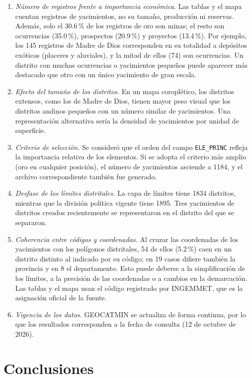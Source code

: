 \documentclass[man,12pt,a4paper,floatsintext,donotrepeattitle]{apa7}
\begin{document}
\begin{enumerate}
  \item \textit{Número de registros frente a importancia económica.} Las tablas
  y el mapa cuentan registros de yacimientos, no su tamaño, producción ni
  reservas. Además, solo el 30.6\,\% de los registros de oro son minas; el resto
  son ocurrencias (35.0\,\%), prospectos (20.9\,\%) y proyectos (13.4\,\%). Por
  ejemplo, los 145 registros de Madre de Dios corresponden en su totalidad a
  depósitos exóticos (placeres y aluviales), y la mitad de ellos (74) son
  ocurrencias. Un distrito con muchas ocurrencias o yacimientos pequeños puede
  aparecer más destacado que otro con un único yacimiento de gran escala.
  \item \textit{Efecto del tamaño de los distritos.} En un mapa coroplético, los
  distritos extensos, como los de Madre de Dios, tienen mayor peso visual que los
  distritos andinos pequeños con un número similar de yacimientos. Una
  representación alternativa sería la densidad de yacimientos por unidad de
  superficie.
  \item \textit{Criterio de selección.} Se consideró que el orden del campo
  \texttt{ELE\_PRINC} refleja la importancia relativa de los elementos. Si se
  adopta el criterio más amplio (oro en cualquier posición), el número de
  yacimientos asciende a 1184, y el archivo correspondiente también fue
  generado.
  \item \textit{Desfase de los límites distritales.} La capa de límites tiene
  1834 distritos, mientras que la división política vigente tiene 1895. Tres
  yacimientos de distritos creados recientemente se representaron en el
  distrito del que se separaron.
  \item \textit{Coherencia entre códigos y coordenadas.} Al cruzar las
  coordenadas de los yacimientos con los polígonos distritales, 54 de ellos
  (5.2\,\%) caen en un distrito distinto al indicado por su código; en 19 casos
  difiere también la provincia y en 8 el departamento. Esto puede deberse a la
  simplificación de los límites, a la precisión de las coordenadas o a cambios
  en la demarcación. Las tablas y el mapa usan el código registrado por
  INGEMMET, que es la asignación oficial de la fuente.
  \item \textit{Vigencia de los datos.} GEOCATMIN se actualiza de forma
  continua, por lo que los resultados corresponden a la fecha de consulta (12
  de octubre de 2026).
\end{enumerate}

\section{Conclusiones}
\end{document}
